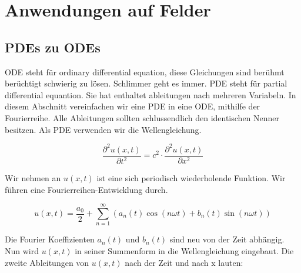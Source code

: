 %
%
%
%



\section{Anwendungen auf Felder\label{fourier:section:teil0}}


\subsection{PDEs zu ODEs\label{fourier:subsection:anwendungenFelder}}


ODE steht für ordinary differential equation, diese Gleichungen sind berühmt berüchtigt schwierig zu lösen.
Schlimmer geht es immer.
PDE steht für partial differential equantion. Sie hat enthaltet ableitungen nach mehreren Variabeln.
In diesem Abschnitt vereinfachen wir eine PDE in eine ODE, mithilfe der Fourierreihe.
Alle Ableitungen sollten schlussendlich den identischen Nenner besitzen.
Als PDE verwenden wir die Wellengleichung.


\begin{equation}
	\frac{\partial^2 u(x, t)}{\partial t^2} = c^2 \cdot \frac{\partial^2 u(x, t)}{\partial x^2}
\end{equation}

Wir nehmen an $u(x, t)$ ist eine sich periodisch wiederholende Funktion. 
Wir führen eine Fourierreihen-Entwicklung durch. 

\begin{equation}
	u(x,t) = \frac{a_0}{2} + \sum_{n=1}^{\infty} \left( a_n(t) \cos(n \omega t) + b_n(t) \sin(n \omega t) \right)
\end{equation}

Die Fourier Koeffizienten $a_n(t)$ und $b_n(t)$ sind neu von der Zeit abhängig.
Nun wird $u(x,t)$ in seiner Summenform in die Wellengleichung eingebaut.
Die zweite Ableitungen von $u(x,t)$ nach der Zeit und nach x lauten:

